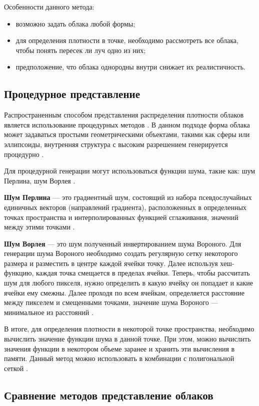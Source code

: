 Особенности данного метода:
\begin{itemize}
	\item возможно задать облака любой формы;
	\item для определения плотности в точке, необходимо рассмотреть все облака, чтобы понять пересек ли луч одно из них;
	\item предположение, что облака однородны внутри снижает их реалистичность. 
\end{itemize}

\subsection{Процедурное представление} 
\label{implicit}
Распространенным способом представления распределения плотности облаков является использование процедурных методов \cite{frostbite, hzd}. В данном подходе форма облака может задаваться простыми геометрическими объектами, такими как сферы или эллипсоиды, внутренняя структура с высоким разрешением генерируется процедурно \cite{clouds}. 

Для процедурной генерации могут использоваться функции шума, такие как: шум Перлина, шум Ворлея \cite{frostbite, hzd}. 

\textbf{Шум Перлина} --- это градиентный шум, состоящий из набора псевдослучайных единичных векторов (направлений градиента), расположенных в определенных точках пространства и интерполированных функцией сглаживания, значений между этими точками \cite{perlin}.

\textbf{Шум Ворлея} --- это шум полученный инвертированием шума Вороного. Для генерации шума Вороного необходимо создать регулярную сетку некоторого размера и разместить в центре каждой ячейки точку. Далее используя хеш-функцию, каждая точка смещается в пределах ячейки. Теперь, чтобы рассчитать шум для любого пикселя, нужно определить в какую ячейку он попадает и какие ячейки ему смежны. Далее проходя по всем ячейкам, определяется расстояние между пикселем и смещенными точками, значение шума Вороного --- минимальное из расстояний \cite{worley}. 


В итоге, для определения плотности в некоторой точке пространства, необходимо вычислить значение функции шума в данной точке. При этом, можно вычислить значения функции в некотором объеме заранее и хранить эти вычисления в памяти. Данный метод можно использовать в комбинации с полигональной сеткой \cite{implicit, hzd, frostbite, clouds}.

\subsection{Сравнение методов представление облаков}

